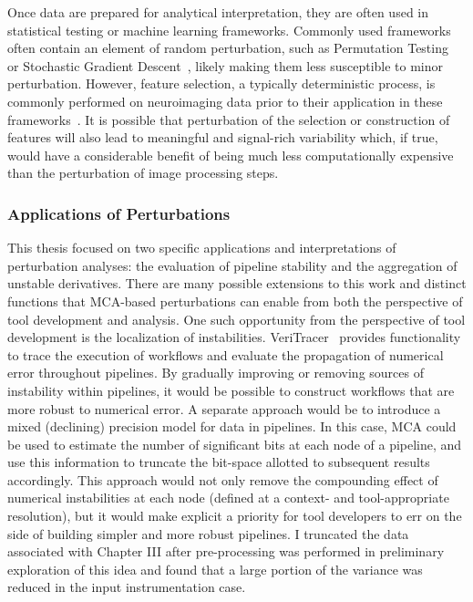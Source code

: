 Once data are prepared for analytical interpretation, they are often used in statistical testing or machine
learning frameworks. Commonly used frameworks often contain an element of random perturbation, such as
Permutation Testing~\cite{oden1975arguments} or Stochastic Gradient Descent~\cite{bottou1991stochastic},
likely making them less susceptible to minor perturbation. However, feature selection, a typically
deterministic process, is commonly performed on neuroimaging data prior to their application in these
frameworks~\cite{mwangi2014review}. It is possible that perturbation of the selection or construction of
features will also lead to meaningful and signal-rich variability which, if true, would have a considerable
benefit of being much less computationally expensive than the perturbation of image processing steps.

\subsubsection{Applications of Perturbations}

This thesis focused on two specific applications and interpretations of perturbation analyses: the evaluation
of pipeline stability and the aggregation of unstable derivatives. There are many possible extensions to this
work and distinct functions that MCA-based perturbations can enable from both the perspective of tool
development and analysis. One such opportunity from the perspective of tool development is the localization of
instabilities. VeriTracer~\cite{chatelain2018veritracer} provides functionality to trace the execution of
workflows and evaluate the propagation of numerical error throughout pipelines. By gradually improving or
removing sources of instability within pipelines, it would be possible to construct workflows that are more
robust to numerical error. A separate approach would be to introduce a mixed (declining) precision model for
data in pipelines. In this case, MCA could be used to estimate the number of significant bits at each node of
a pipeline, and use this information to truncate the bit-space allotted to subsequent results accordingly. This
approach would not only remove the compounding effect of numerical instabilities at each node (defined at a
context- and tool-appropriate resolution), but it would make explicit a priority for tool developers to err on
the side of building simpler and more robust pipelines. I truncated the data associated with Chapter III after
pre-processing was performed in preliminary exploration of this idea and found that a large portion of the
variance was reduced in the input instrumentation case.

